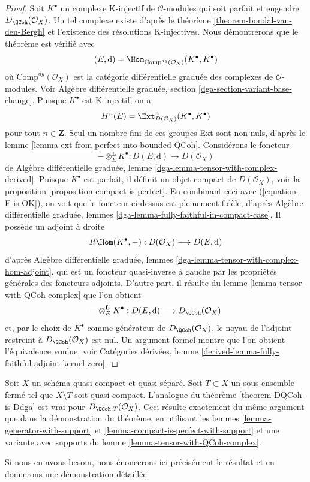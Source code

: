 \begin{proof}
Soit $K^\bullet$ un complexe K-injectif de $\mathcal{O}$-modules qui
soit parfait et engendre $D_\QCoh(\mathcal{O}_X)$. Un tel complexe
existe d'après le théorème \ref{theorem-bondal-van-den-Bergh}
et l'existence des résolutions K-injectives. Nous démontrerons que le
théorème est vérifié avec
$$
(E, \text{d}) = \Hom_{\text{Comp}^{dg}(\mathcal{O}_X)}(K^\bullet, K^\bullet)
$$
où $\text{Comp}^{dg}(\mathcal{O}_X)$ est la catégorie différentielle graduée
des complexes de $\mathcal{O}$-modules. Voir
Algèbre différentielle graduée, section \ref{dga-section-variant-base-change}.
Puisque $K^\bullet$ est K-injectif, on
a
\begin{equation}
\label{equation-E-is-OK}
H^n(E) = \Ext^n_{D(\mathcal{O}_X)}(K^\bullet, K^\bullet)
\end{equation}
pour tout $n \in \mathbf{Z}$. Seul un nombre fini de ces groupes Ext
sont non nuls, d'après le lemme \ref{lemma-ext-from-perfect-into-bounded-QCoh}.
Considérons le foncteur
$$
- \otimes_E^\mathbf{L} K^\bullet :
D(E, \text{d}) \longrightarrow D(\mathcal{O}_X)
$$
de
Algèbre différentielle graduée, lemme
\ref{dga-lemma-tensor-with-complex-derived}.
Puisque $K^\bullet$ est parfait, il définit un objet compact de
$D(\mathcal{O}_X)$, voir la proposition \ref{proposition-compact-is-perfect}.
En combinant ceci avec (\ref{equation-E-is-OK}), on voit que le foncteur ci-dessus est pleinement
fidèle, d'après
Algèbre différentielle graduée, lemmes
\ref{dga-lemma-fully-faithful-in-compact-case}. Il possède un adjoint à droite
$$
R\Hom(K^\bullet, - ) : D(\mathcal{O}_X) \longrightarrow D(E, \text{d})
$$
d'après Algèbre différentielle graduée, lemmes
\ref{dga-lemma-tensor-with-complex-hom-adjoint},
qui est un foncteur quasi-inverse à gauche par les propriétés générales des foncteurs
adjoints. D'autre part, il résulte du
lemme \ref{lemma-tensor-with-QCoh-complex} que l'on obtient
$$
- \otimes_E^\mathbf{L} K^\bullet :
D(E, \text{d}) \longrightarrow D_\QCoh(\mathcal{O}_X)
$$
et, par le choix de $K^\bullet$ comme générateur de
$D_\QCoh(\mathcal{O}_X)$, le noyau de l'adjoint
restreint à $D_\QCoh(\mathcal{O}_X)$ est nul.
Un argument formel montre que l'on obtient l'équivalence voulue, voir
Catégories dérivées, lemme
\ref{derived-lemma-fully-faithful-adjoint-kernel-zero}.
\end{proof}

\begin{remark}
\label{remark-DQCoh-is-Ddga-with-support}
Soit $X$ un schéma quasi-compact et quasi-séparé. Soit $T \subset X$
un sous-ensemble fermé tel que $X \setminus T$ soit quasi-compact.
L'analogue du théorème \ref{theorem-DQCoh-is-Ddga} est vrai
pour $D_{\QCoh, T}(\mathcal{O}_X)$.
Ceci résulte exactement du même argument que dans la démonstration
du théorème, en utilisant les
lemmes \ref{lemma-generator-with-support} et
\ref{lemma-compact-is-perfect-with-support}
et une variante avec supports du lemme \ref{lemma-tensor-with-QCoh-complex}.

Si nous en avons besoin, nous énoncerons ici précisément le
résultat et en donnerons une démonstration détaillée.
\end{remark}

